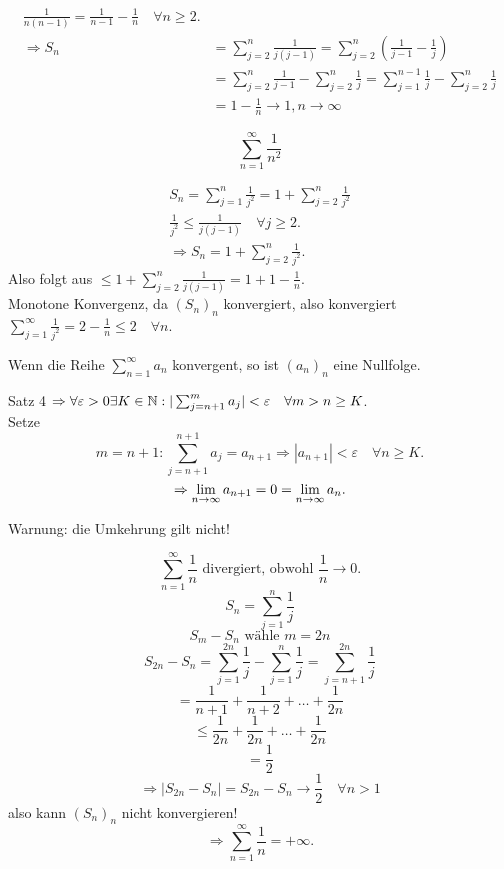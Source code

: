\begin{bew}
	\begin{align*}
		\frac{1}{n(n-1)} =\frac{1}{n-1} - \frac{1}{n} \quad\forall n\geq 2.\\
		\Rightarrow S_n &= \sum_{j=2}^{n} \frac{1}{j(j-1)} = \sum_{j=2}^{n} \left( \frac{1}{j-1} - \frac{1}{j} \right)\\
		&= \sum_{j=2}^{n} \frac{1}{j-1} - \sum_{j=2}^{n} \frac{1}{j} = \sum_{j=1}^{n-1}\frac{1}{j} - \sum_{j=2}^{n}\frac{1}{j}\\
		&= 1 - \frac{1}{n} \rightarrow 1, n\rightarrow \infty
	\end{align*}
\end{bew}
\begin{bsp}
	\[ \sum_{n=1}^{\infty} \frac{1}{n^2} \]
\end{bsp}
\begin{bew}
	\begin{align*}
		S_n = \sum_{j=1}^{n}\frac{1}{j^2} = 1 + \sum_{j=2}^{n} \frac{1}{j^2}\\
		\frac{1}{j^2} \leq \frac{1}{j(j-1)} \quad \forall j\geq 2.\\
		\Rightarrow S_n = 1 + \sum_{j=2}^{n} \frac{1}{j^2}.
	\end{align*}
	Also folgt aus \( \leq 1 + \sum_{j=2}^{n} \frac{1}{j(j-1)} = 1 + 1 - \frac{1}{n} \).\\
	Monotone Konvergenz, da \((S_n)_n\) konvergiert, also konvergiert \(\sum_{j=1}^{\infty} \frac{1}{j^2} = 2 - \frac{1}{n} \leq 2 \quad\forall n \).
\end{bew}
\begin{kor}
	Wenn die Reihe \(\sum_{n=1}^{\infty} a_n\) konvergent, so ist \((a_n)_n\) eine Nullfolge.
\end{kor}
\begin{bew}
	Satz 4 \( \Rightarrow \forall \varepsilon >0 \exists K\in\mathbb{N}:|\sum_{j=n+1}^{m}a_j| < \varepsilon \quad \forall m>n\geq K \).\\
	Setze \[ m=n+1 : \sum_{j=n+1}^{n+1} a_j = a_{n+1} \Rightarrow |a_{n+1}|<\varepsilon \quad \forall n\geq K. \]
	\[ \Rightarrow \lim\limits_{n\rightarrow\infty}a_{n+1}=0=\lim\limits_{n\rightarrow\infty}a_n. \]
\end{bew}
\begin{bem}
	Warnung: die Umkehrung gilt nicht!
\end{bem}
\begin{bsp}
	\[ \sum_{n=1}^{\infty} \frac{1}{n} \text{ divergiert, obwohl } \frac{1}{n} \rightarrow 0. \]
	\[ S_n = \sum_{j=1}^{n}\frac{1}{j} \]
	\[ S_m -S_n \text{ wähle }m=2n \]
	\[ S_{2n} - S_n = \sum_{j=1}^{2n}\frac{1}{j} - \sum_{j=1}^{n}\frac{1}{j} = \sum_{j=n+1}^{2n}\frac{1}{j} \]
	\[ = \frac{1}{n+1} + \frac{1}{n+2} + \dots + \frac{1}{2n} \]
	\[ \leq \frac{1}{2n} + \frac{1}{2n} + \dots + \frac{1}{2n} \]
	\[ = \frac{1}{2} \]
	\[ \Rightarrow |S_{2n}-S_n| = S_{2n}-S_n \rightarrow \frac{1}{2} \quad\forall n>1 \]
	also kann \((S_n)_n\) nicht konvergieren!
	\[ \Rightarrow \sum_{n=1}^{\infty} \frac{1}{n} = +\infty. \]
\end{bsp}
